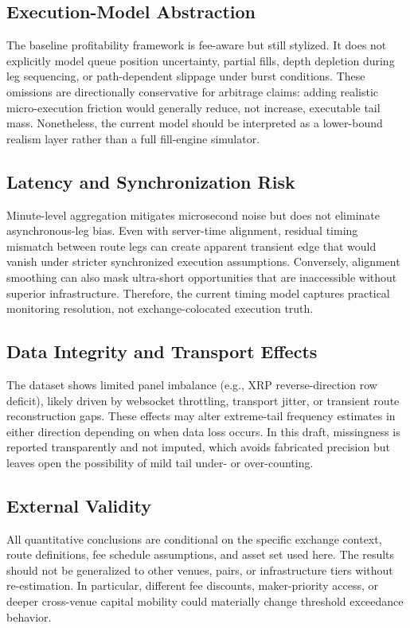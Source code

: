 \documentclass[11pt,a4paper]{article}
\begin{document}
\subsection{Execution-Model Abstraction}
The baseline profitability framework is fee-aware but still stylized. It does not explicitly model queue position uncertainty, partial fills, depth depletion during leg sequencing, or path-dependent slippage under burst conditions. These omissions are directionally conservative for arbitrage claims: adding realistic micro-execution friction would generally reduce, not increase, executable tail mass. Nonetheless, the current model should be interpreted as a lower-bound realism layer rather than a full fill-engine simulator.

\subsection{Latency and Synchronization Risk}
Minute-level aggregation mitigates microsecond noise but does not eliminate asynchronous-leg bias. Even with server-time alignment, residual timing mismatch between route legs can create apparent transient edge that would vanish under stricter synchronized execution assumptions. Conversely, alignment smoothing can also mask ultra-short opportunities that are inaccessible without superior infrastructure. Therefore, the current timing model captures practical monitoring resolution, not exchange-colocated execution truth.

\subsection{Data Integrity and Transport Effects}
The dataset shows limited panel imbalance (e.g., XRP reverse-direction row deficit), likely driven by websocket throttling, transport jitter, or transient route reconstruction gaps. These effects may alter extreme-tail frequency estimates in either direction depending on when data loss occurs. In this draft, missingness is reported transparently and not imputed, which avoids fabricated precision but leaves open the possibility of mild tail under- or over-counting.

\subsection{External Validity}
All quantitative conclusions are conditional on the specific exchange context, route definitions, fee schedule assumptions, and asset set used here. The results should not be generalized to other venues, pairs, or infrastructure tiers without re-estimation. In particular, different fee discounts, maker-priority access, or deeper cross-venue capital mobility could materially change threshold exceedance behavior.
\end{document}
